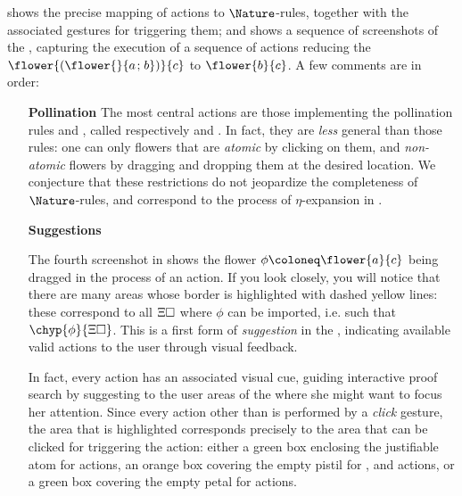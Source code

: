 \begin{scope}
 shows the precise mapping of \Proof actions to
$\Nature$-rules, together with the associated gestures for triggering them; and
 shows a sequence of screenshots of the , capturing the execution of a sequence of \Proof actions reducing the
 $\flower{(\flower{}{a \sep b})}{c}$ to $\flower{b}{c}$. A few
comments are in order:

\begin{itemize}
  \item[\textbf{Pollination}] The most central actions are those implementing
  the pollination rules  and , called respectively
   and . In fact, they are \emph{less} general
  than those rules: one can only  flowers that are \emph{atomic}
  by clicking on them, and  \emph{non-atomic} flowers by dragging
  and dropping them at the desired location. We conjecture that these
  restrictions do not jeopardize the completeness of $\Nature$-rules, and
  correspond to the process of $\eta$-expansion in .
  
  \item[\textbf{Suggestions}]
  
  The fourth screenshot in  shows the flower $\phi
  \deq \flower{a}{c}$ being dragged in the process of an  action.
  If you look closely, you will notice that there are many areas whose border is
  highlighted with dashed yellow lines: these correspond to all 
  $\Xi\square$ where $\phi$ can be imported, i.e. such that
  $\chyp{\phi}{\Xi\hole}$. This is a first form of \emph{suggestion} in the
  , indicating available valid actions to the user through visual
  feedback.

  In fact, every \Proof action has an associated visual cue, guiding interactive
  proof search by suggesting to the user areas of the  where she might want
  to focus her attention. Since every action other than  is
  performed by a \emph{click} gesture, the area that is highlighted corresponds
  precisely to the area that can be clicked for triggering the action: either a
  green box enclosing the justifiable atom for  actions, an
  orange box covering the empty pistil for ,  and
   actions, or a green box covering the empty petal for
   actions.
  

\end{itemize}
\end{scope}
